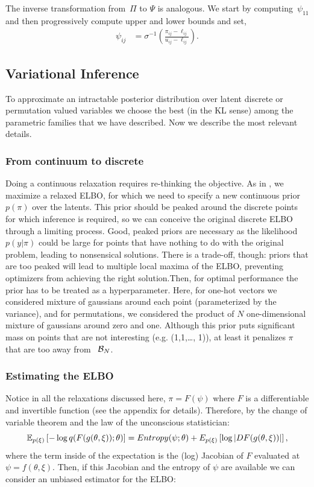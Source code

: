 \documentclass{article}
\begin{document}
The inverse transformation from~${\Pi}$ to $\Psi$ is analogous.
We start by computing~$\psi_{11}$ and then progressively compute
upper and lower bounds and set,
\begin{align}
\psi_{ij} &= \sigma^{-1} \left( \frac{{\pi}_{ij} - \ell_{ij}}{u_{ij} - \ell_{ij}} \right ).
\end{align}



 \subsection{Variational Inference}
To approximate an intractable posterior distribution over latent discrete or permutation valued variables we choose the best (in the KL sense) among the parametric families that we have described. Now we describe the most relevant details.

\subsubsection{From continuum to discrete}
Doing a continuous relaxation requires re-thinking the objective. As in \cite{maddison2016concrete}, we maximize a relaxed ELBO, for which we need to specify a new continuous prior $p(\pi)$ over the latents. This prior should be peaked around the discrete points for which inference is required, so we can conceive the original discrete ELBO through a limiting process. Good, peaked priors are necessary as the likelihood $p(y|\pi)$ could be large for points that have nothing to do with the original problem, leading to nonsensical solutions. There is a trade-off, though: priors that are too peaked will lead to multiple local maxima of the ELBO, preventing optimizers from achieving the right solution.Then, for optimal performance the prior has to be treated as a hyperparameter. Here, for one-hot vectors we considered mixture of gaussians around each point (parameterized by the variance), and for permutations, we considered the product of $N$ one-dimensional mixture of gaussians around zero and one. Although this prior puts significant mass on points that are not interesting (e.g. (1,1,\ldots, 1)), at least it penalizes $\pi$ that are too away from ~$\mathcal{B}_N$.


\subsubsection{Estimating the ELBO}
Notice in all the relaxations discussed here, $\pi = F(\psi)$ where $F$ is a differentiable and invertible function  (see the appendix for details). Therefore, by the change of variable theorem and the law of the unconscious statistician:
$$ \mathbb{E}_{p(\xi)} \left[- \log q(F(g(\theta, \xi)); \theta) \right] = Entropy(\psi;\theta)+E_{p(\xi)}\left[\log | DF(g(\theta, \xi))|\right],$$
where the term inside of the expectation is the (log) Jacobian of $F$ evaluated at $\psi = f(\theta,\xi)$. Then, if this Jacobian and the entropy of $\psi$ are available we can consider an unbiased estimator for the ELBO:
\end{document}
